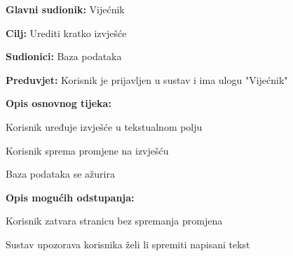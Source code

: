 					\noindent {}
					\begin{packed_item}
	
						\item \textbf{Glavni sudionik: }Vijećnik
						\item  \textbf{Cilj:} Urediti kratko izvješće
						\item  \textbf{Sudionici:} Baza podataka
						\item  \textbf{Preduvjet:} Korisnik je prijavljen u sustav i ima ulogu "Vijećnik"
						\item  \textbf{Opis osnovnog tijeka:}
						
						\item[] \begin{packed_enum}
	
							\item Korisnik uređuje izvješće u tekstualnom polju 
							\item Korisnik sprema promjene na izvješću
							\item Baza podataka se ažurira
							
							
							
						\end{packed_enum}
						\item  \textbf{Opis mogućih odstupanja:}
						
						\item[] \begin{packed_item}
						\item[2.a] Korisnik zatvara stranicu bez spremanja promjena
							\item[] \begin{packed_enum}
								
								\item Sustav upozorava korisnika želi li spremiti napisani tekst
								
							\end{packed_enum}
						\end{packed_item}
						
						
						
					\end{packed_item}					
					

